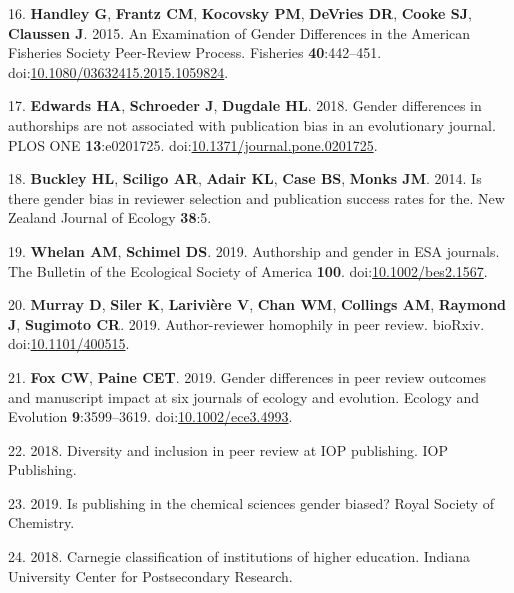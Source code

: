 \documentclass[11pt,]{article}
\begin{document}
\hypertarget{ref-handley_examination_2015}{}
16. \textbf{Handley G}, \textbf{Frantz CM}, \textbf{Kocovsky PM},
\textbf{DeVries DR}, \textbf{Cooke SJ}, \textbf{Claussen J}. 2015. An
Examination of Gender Differences in the American Fisheries Society
Peer-Review Process. Fisheries \textbf{40}:442--451.
doi:\href{https://doi.org/10.1080/03632415.2015.1059824}{10.1080/03632415.2015.1059824}.

\hypertarget{ref-edwards_gender_2018}{}
17. \textbf{Edwards HA}, \textbf{Schroeder J}, \textbf{Dugdale HL}.
2018. Gender differences in authorships are not associated with
publication bias in an evolutionary journal. PLOS ONE
\textbf{13}:e0201725.
doi:\href{https://doi.org/10.1371/journal.pone.0201725}{10.1371/journal.pone.0201725}.

\hypertarget{ref-buckley_is_2014}{}
18. \textbf{Buckley HL}, \textbf{Sciligo AR}, \textbf{Adair KL},
\textbf{Case BS}, \textbf{Monks JM}. 2014. Is there gender bias in
reviewer selection and publication success rates for the. New Zealand
Journal of Ecology \textbf{38}:5.

\hypertarget{ref-Whelan2019}{}
19. \textbf{Whelan AM}, \textbf{Schimel DS}. 2019. Authorship and gender
in ESA journals. The Bulletin of the Ecological Society of America
\textbf{100}.
doi:\href{https://doi.org/10.1002/bes2.1567}{10.1002/bes2.1567}.

\hypertarget{ref-Murray400515}{}
20. \textbf{Murray D}, \textbf{Siler K}, \textbf{Larivière V},
\textbf{Chan WM}, \textbf{Collings AM}, \textbf{Raymond J},
\textbf{Sugimoto CR}. 2019. Author-reviewer homophily in peer review.
bioRxiv. doi:\href{https://doi.org/10.1101/400515}{10.1101/400515}.

\hypertarget{ref-fox_gender_2019}{}
21. \textbf{Fox CW}, \textbf{Paine CET}. 2019. Gender differences in
peer review outcomes and manuscript impact at six journals of ecology
and evolution. Ecology and Evolution \textbf{9}:3599--3619.
doi:\href{https://doi.org/10.1002/ece3.4993}{10.1002/ece3.4993}.

\hypertarget{ref-Physics_2018}{}
22. 2018. Diversity and inclusion in peer review at IOP publishing. IOP
Publishing.

\hypertarget{ref-RoyalChem_2019}{}
23. 2019. Is publishing in the chemical sciences gender biased? Royal
Society of Chemistry.

\hypertarget{ref-Carnegie2018}{}
24. 2018. Carnegie classification of institutions of higher education.
Indiana University Center for Postsecondary Research.
\end{document}
